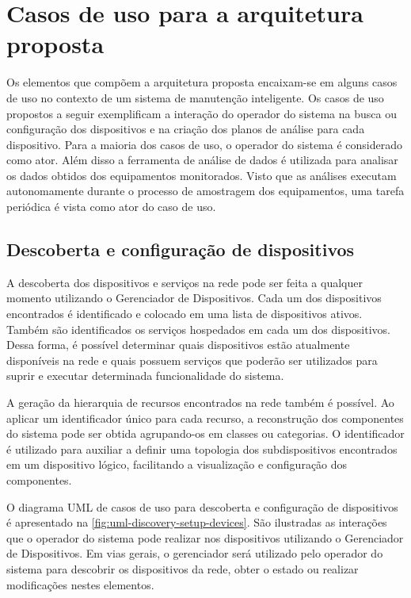 \section{Casos de uso para a arquitetura proposta}

Os elementos que compõem a arquitetura proposta encaixam-se em alguns casos de uso no contexto de um
sistema de manutenção inteligente. Os casos de uso propostos a seguir exemplificam a interação do
operador do sistema na busca ou configuração dos dispositivos e na criação dos planos de análise
para cada dispositivo. Para a maioria dos casos de uso, o operador do sistema é considerado como
ator. Além disso a ferramenta de análise de dados é utilizada para analisar os dados obtidos dos
equipamentos monitorados. Visto que as análises executam autonomamente durante o processo de
amostragem dos equipamentos, uma tarefa periódica é vista como ator do caso de uso.


\subsection{Descoberta e configuração de dispositivos}
\label{sub:proposta-descoberta-configuracao-dispositivos}

A descoberta dos dispositivos e serviços na rede pode ser feita a qualquer momento utilizando o
Gerenciador de Dispositivos. Cada um dos dispositivos encontrados é identificado e colocado em uma
lista de dispositivos ativos. Também são identificados os serviços hospedados em cada um dos
dispositivos. Dessa forma, é possível determinar quais dispositivos estão atualmente disponíveis na
rede e quais possuem serviços que poderão ser utilizados para suprir e executar determinada
funcionalidade do sistema.

A geração da hierarquia de recursos encontrados na rede também é possível. Ao aplicar um
identificador único para cada recurso, a reconstrução dos componentes do sistema pode ser obtida
agrupando-os em classes ou categorias. O identificador é utilizado para auxiliar a definir uma
topologia dos subdispositivos encontrados em um dispositivo lógico, facilitando a visualização e
configuração dos componentes.

O diagrama \gls{UML} de casos de uso para descoberta e configuração de dispositivos é apresentado na
\cref{fig:uml-discovery-setup-devices}. São ilustradas as interações que o operador do sistema pode
realizar nos dispositivos utilizando o Gerenciador de Dispositivos. Em vias gerais, o gerenciador
será utilizado pelo operador do sistema para descobrir os dispositivos da rede, obter o estado ou
realizar modificações nestes elementos.

